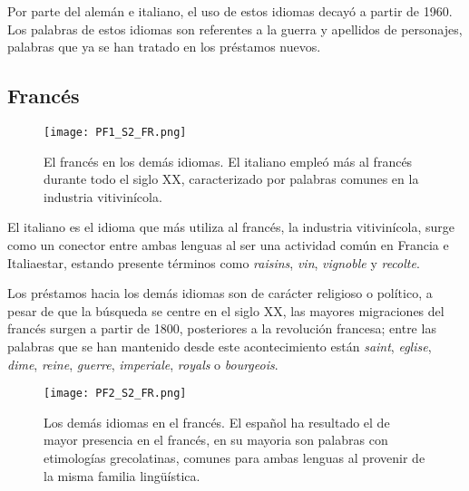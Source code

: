 Por parte del alemán e italiano, el uso de estos idiomas decayó a partir de 1960.  Los palabras de estos idiomas son referentes a la guerra y apellidos de personajes, palabras que ya se han tratado en los préstamos nuevos. 

 





\subsection{Francés} %

\begin{figure}%
	\centering
	\texttt{[image: PF1\_S2\_FR.png]}
	\label{fig.ST_a_FR}
	\caption{El francés en los demás idiomas. El italiano empleó más al francés durante todo el siglo XX, caracterizado por palabras comunes en la industria vitivinícola.}
\end{figure}


El italiano es el idioma que más utiliza al francés,  la industria vitivinícola, surge como un conector entre ambas lenguas al ser una actividad común en Francia e Italiaestar, estando presente términos como  \textit{raisins}, \textit{vin}, \textit{vignoble} y \textit{recolte}.

Los préstamos hacia los demás idiomas son de carácter religioso o político, a pesar de que la búsqueda se centre en el siglo XX, las mayores migraciones del francés surgen a partir de 1800, posteriores a la revolución francesa; entre las palabras que se han mantenido desde este acontecimiento están  \textit{saint}, \textit{eglise}, \textit{dime}, \textit{reine}, \textit{guerre}, \textit{imperiale}, \textit{royals} o \textit{bourgeois}.  


\begin{figure}%
	\centering
	\texttt{[image: PF2\_S2\_FR.png]}
	\label{fig.ST_b_FR}
	\caption{Los demás idiomas en el francés. El español ha resultado el de mayor presencia en el francés, en su mayoria son palabras con etimologías grecolatinas, comunes para ambas lenguas al provenir de la misma familia lingüística.}
\end{figure}
		
